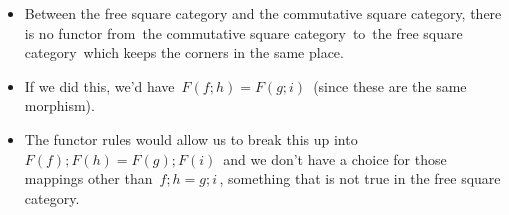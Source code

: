 \begin{itemize}
    \item  Between the free square category and the commutative square category, there is no functor from \,the commutative square category\, to \,the free square category\, which keeps the corners in the same place.
    \item If we did this, we'd have \,$F(f;h)=F(g;i)$\, (since these are the same morphism).
    \item The functor rules would allow us to break this up into \,$F(f);F(h)=F(g);F(i)$\, and we don't have a choice for those mappings other than \,$f;h=g;i$\,, something that is not true in the free square category.
  \end{itemize}
